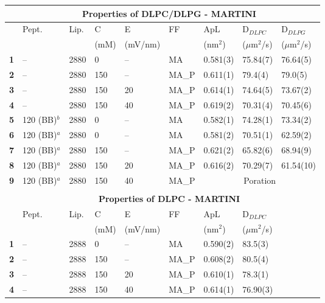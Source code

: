 \begin{figure}
\centering
\vspace{1.5cm}
\scriptsize
 \def\arraystretch{1.6}
\begin{tabular}{lllllllll}
& \multicolumn{8}{c}{\textbf{Properties of DLPC/DLPG - MARTINI}} \\
 \hline
& Pept. & Lip. & C & E & FF & ApL & D$_{DLPC}$ & D$_{DLPG}$ \\
& & & (mM) & (mV/nm) & & (nm$^2$) & ($\mu$m$^2$/s) & ($\mu$m$^2$/s) \\
 \hline
\textbf{1} & -- & 2880 & 0 & -- & MA & 0.581(3) & 75.84(7) & 76.64(5) \\ 
\textbf{2} & -- & 2880 & 150 & -- & MA\_P & 0.611(1) & 79.4(4) & 79.0(5) \\
\textbf{3} & -- & 2880 & 150 & 20 & MA\_P & 0.614(1) & 74.64(5) & 73.67(2) \\
\textbf{4} & -- & 2880 & 150 & 40 & MA\_P & 0.619(2) & 70.31(4) & 70.45(6) \\
 \hline
\textbf{5} & 120 (BB)$^b$ & 2880 & 0 & -- & MA & 0.582(1) & 74.28(1) & 73.34(2) \\
\textbf{6} & 120 (BB)$^a$ & 2880 & 0 & -- & MA & 0.581(2) & 70.51(1) & 62.59(2) \\ 
\textbf{7} & 120 (BB)$^a$ & 2880 & 150 & -- & MA\_P & 0.621(2) & 65.82(6) & 68.94(9) \\
\textbf{8} & 120 (BB)$^a$ & 2880 & 150 & 20 & MA\_P & 0.616(2) & 70.29(7) & 61.54(10) \\
\textbf{9} & 120 (BB)$^a$ & 2880 & 150 & 40 & MA\_P & \multicolumn{3}{c}{Poration} \\
\hline
&\multicolumn{8}{c}{} \\
&\multicolumn{8}{c}{\textbf{Properties of DLPC - MARTINI}} \\
 \hline
& Pept. & Lip. & C & E & FF & ApL & D$_{DLPC}$ & \\
& & & (mM) & (mV/nm) & & (nm$^2$) & ($\mu$m$^2$/s) & \\
 \hline
\textbf{1} & -- & 2888 & 0 & -- & MA & 0.590(2) & 83.5(3) \\ 
\textbf{2} & -- & 2888 & 150 & -- & MA\_P & 0.608(2) & 80.5(4) & \\
\textbf{3} & -- & 2888 & 150 & 20 & MA\_P & 0.610(1) & 78.3(1) & \\
\textbf{4} & -- & 2888 & 150 & 40 & MA\_P & 0.614(1) & 76.90(3) & \\

\end{tabular}
\end{figure}
